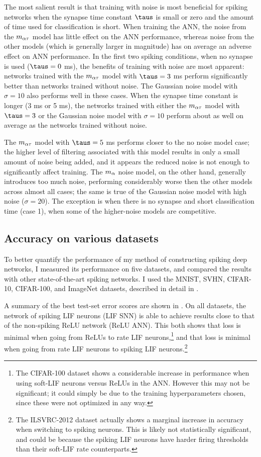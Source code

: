 The most salient result is that training with noise
is most beneficial for spiking networks
when the synapse time constant $\taus$ is small or zero
and the amount of time used for classification is short.
When training the ANN, the noise from the $m_{\alpha\tau}$ model has little effect
on the ANN performance,
whereas noise from the other models (which is generally larger in magnitude)
has on average an adverse effect on ANN performance.
In the first two spiking conditions, when no synapse is used ($\taus = 0$ ms),
the benefits of training with noise are most apparent:
networks trained with the $m_{\alpha\tau}$ model with $\taus = 3$ ms
perform significantly better than networks trained without noise.
The Gaussian noise model with $\sigma = 10$ also performs well in these cases.
When the synapse time constant is longer (3 ms or 5 ms),
the networks trained with either the $m_{\alpha\tau}$ model with $\taus = 3$
or the Gaussian noise model with $\sigma = 10$
perform about as well on average as the networks trained without noise.

The $m_{\alpha\tau}$ model with $\taus = 5$ ms performs closer to the no noise model case;
the higher level of filtering associated with this model
results in only a small amount of noise being added,
and it appears the reduced noise is not enough to significantly affect training.
The $m_\alpha$ noise model, on the other hand, generally introduces too much noise,
performing considerably worse then the other models across almost all cases;
the same is true of the Gaussian noise model with high noise ($\sigma = 20$).
The exception is when there is no synapse and short classification time (case 1),
when some of the higher-noise models are competitive.


\subsection{Accuracy on various datasets}

To better quantify the performance of my method of constructing spiking deep networks,
I measured its performance on five datasets,
and compared the results with other state-of-the-art spiking networks.
I used the MNIST, SVHN, CIFAR-10, CIFAR-100, and ImageNet datasets,
described in detail in .

A summary of the best test-set error scores are shown in .
On all datasets, the network of spiking LIF neurons (LIF SNN)
is able to achieve results close to that of the non-spiking ReLU network (ReLU ANN).
This both shows that loss is minimal
when going from ReLUs to rate LIF neurons,\footnote{
  The CIFAR-100 dataset shows a considerable increase in performance
  when using soft-LIF neurons versus ReLUs in the ANN.
  However this may not be significant;
  it could simply be due to the training hyperparameters chosen,
  since these were not optimized in any way.}
and that loss is minimal when going from rate LIF neurons to spiking LIF neurons.\footnote{
  The ILSVRC-2012 dataset actually shows a marginal increase in accuracy
  when switching to spiking neurons.
  This is likely not statistically significant,
  and could be because the spiking LIF neurons have harder firing thresholds
  than their soft-LIF rate counterparts.}

